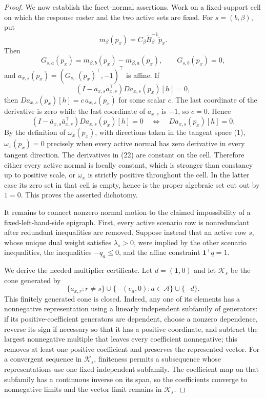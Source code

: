 \documentclass{article}
\begin{document}
\begin{proof}
We now establish the facet-normal assertions.  Work on a fixed-support cell on which the response roster and the two active sets are fixed.  For \(s=(b,\beta)\), put
\[
 m_\beta(p_x)=C_\beta\widetilde B_\beta^{-1}\widetilde p_x.
\]
Then
\[
 G_{s,a}(p_x)=m_{\beta,b}(p_x)-m_{\beta,a}(p_x),
 \qquad G_{s,b}(p_x)=0,
 \tag{22}
\]
and \(a_{x,s}(p_x)=(G_{s,\cdot}(p_x)^\top,-1)^\top\) is affine.  If
\[
 (I-\bar a_{x,s}\bar a_{x,s}^\top)Da_{x,s}(p_x)[h]=0,
\]
then \(Da_{x,s}(p_x)[h]=c\,a_{x,s}(p_x)\) for some scalar \(c\).  The last coordinate of the derivative is zero while the last coordinate of \(a_{x,s}\) is \(-1\), so \(c=0\).  Hence
\[
 (I-\bar a_{x,s}\bar a_{x,s}^\top)Da_{x,s}(p_x)[h]=0
 \quad\Longleftrightarrow\quad
 Da_{x,s}(p_x)[h]=0.
 \tag{23}
\]
By the definition of \(\omega_x(p_x)\), with directions taken in the tangent space (1), \(\omega_x(p_x)=0\) precisely when every active normal has zero derivative in every tangent direction.  The derivatives in (22) are constant on the cell.  Therefore either every active normal is locally constant, which is stronger than constancy up to positive scale, or \(\omega_x\) is strictly positive throughout the cell.  In the latter case its zero set in that cell is empty, hence is the proper algebraic set cut out by \(1=0\).  This proves the asserted dichotomy.

It remains to connect nonzero normal motion to the claimed impossibility of a fixed-left-hand-side epigraph.  First, every active scenario row is nonredundant after redundant inequalities are removed.  Suppose instead that an active row \(s\), whose unique dual weight satisfies \(\lambda_s>0\), were implied by the other scenario inequalities, the inequalities \(-q_a\leq0\), and the affine constraint \(\mathbf 1^\top q=1\).

We derive the needed multiplier certificate.  Let \(d=(\mathbf 1,0)\) and let \(\mathcal K_s\) be the cone generated by
\[
 \{a_{x,r}:r\ne s\}\cup
 \{-(e_a,0):a\in\mathcal A\}\cup\{-d\}.
\]
This finitely generated cone is closed.  Indeed, any one of its elements has a nonnegative representation using a linearly independent subfamily of generators: if its positive-coefficient generators are dependent, choose a nonzero dependence, reverse its sign if necessary so that it has a positive coordinate, and subtract the largest nonnegative multiple that leaves every coefficient nonnegative; this removes at least one positive coefficient and preserves the represented vector.  For a convergent sequence in \(\mathcal K_s\), finiteness permits a subsequence whose representations use one fixed independent subfamily.  The coefficient map on that subfamily has a continuous inverse on its span, so the coefficients converge to nonnegative limits and the vector limit remains in \(\mathcal K_s\).


\end{proof}
\end{document}
